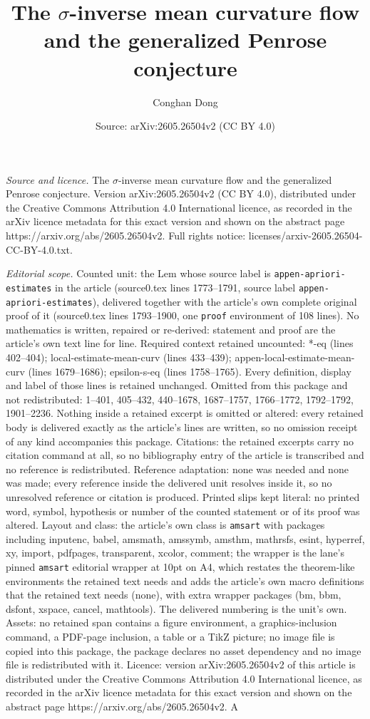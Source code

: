\documentclass[10pt,a4paper]{amsart}
\title[The $\sigma$-inverse mean curvature flow and the generalized]{The $\sigma$-inverse mean curvature flow and the generalized Penrose conjecture}
\author{Conghan Dong}
\date{Source: arXiv:2605.26504v2 (CC BY 4.0)}
\begin{document}
\maketitle

\noindent\emph{Source and licence.} The $\sigma$-inverse mean curvature flow and the generalized Penrose conjecture. Version arXiv:2605.26504v2 (CC BY 4.0), distributed under the Creative Commons Attribution 4.0 International licence, as recorded in the arXiv licence metadata for this exact version and shown on the abstract page https://arxiv.org/abs/2605.26504v2. Full rights notice: licenses/arxiv-2605.26504-CC-BY-4.0.txt.\par\smallskip

\noindent\textit{Editorial scope.} Counted unit: the Lem whose source label is \texttt{appen-apriori-estimates} in the article (source0.tex lines 1773--1791, source label \texttt{appen-apriori-estimates}), delivered together with the article's own complete original proof of it (source0.tex lines 1793--1900, one \texttt{proof} environment of 108 lines). No mathematics is written, repaired or re-derived: statement and proof are the article's own text line for line. Required context retained uncounted: *-eq (lines 402--404); local-estimate-mean-curv (lines 433--439); appen-local-estimate-mean-curv (lines 1679--1686); epsilon-s-eq (lines 1758--1765). Every definition, display and label of those lines is retained unchanged. Omitted from this package and not redistributed: 1--401, 405--432, 440--1678, 1687--1757, 1766--1772, 1792--1792, 1901--2236. Nothing inside a retained excerpt is omitted or altered: every retained body is delivered exactly as the article's lines are written, so no omission receipt of any kind accompanies this package. Citations: the retained excerpts carry no citation command at all, so no bibliography entry of the article is transcribed and no reference is redistributed. Reference adaptation: none was needed and none was made; every reference inside the delivered unit resolves inside it, so no unresolved reference or citation is produced. Printed slips kept literal: no printed word, symbol, hypothesis or number of the counted statement or of its proof was altered. Layout and class: the article's own class is \texttt{amsart} with packages including inputenc, babel, amsmath, amssymb, amsthm, mathrsfs, esint, hyperref, xy, import, pdfpages, transparent, xcolor, comment; the wrapper is the lane's pinned \texttt{amsart} editorial wrapper at 10pt on A4, which restates the theorem-like environments the retained text needs and adds the article's own macro definitions that the retained text needs (none), with extra wrapper packages (bm, bbm, dsfont, xspace, cancel, mathtools). The delivered numbering is the unit's own. Assets: no retained span contains a figure environment, a graphics-inclusion command, a PDF-page inclusion, a table or a TikZ picture; no image file is copied into this package, the package declares no asset dependency and no image file is redistributed with it. Licence: version arXiv:2605.26504v2 of this article is distributed under the Creative Commons Attribution 4.0 International licence, as recorded in the arXiv licence metadata for this exact version and shown on the abstract page https://arxiv.org/abs/2605.26504v2. A 
\end{document}
